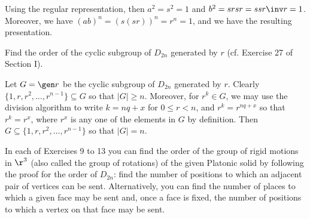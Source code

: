 \begin{problems}
\begin{sol}
        Using the regular representation, then $a^2 = s^2 = 1$ and $b^2 = srsr = ssr\inv r = 1$. Moreover, we have $(ab)^n = (s(sr))^n = r^n = 1$, and we have the resulting presentation.
    \end{sol}
    \item Find the order of the cyclic subgroup of $D_{2n}$ generated by $r$ (cf. Exercise 27 of Section I).
    \begin{sol}
        Let $G = \gen r$ be the cyclic subgroup of $D_{2n}$ generated by $r$. Clearly $\{1, r, r^2, \ldots, r^{n - 1}\} \subseteq G$ so that $|G| \geq n$. Moreover, for $r^k \in G$, we may use the division algorithm to write $k = nq + x$ for $0 \leq r < n$, and $r^k = r^{nq + x}$ so that $r^k = r^x$, where $r^x$ is any one of the elements in $G$ by definition. Then $G \subseteq \{1, r, r^2, \ldots, r^{n - 1}\}$ so that $|G| = n$.
    \end{sol}
\end{problems}
In each of Exercises 9 to 13 you can find the order of the group of rigid motions in $\r^3$ (also called the group of rotations) of the given Platonic solid by following the proof for the order of $D_{2n}$: find the number of positions to which an adjacent pair of vertices can be sent. Alternatively, you can find the number of places to which a given face may be sent and, once a face is fixed, the number of positions to which a vertex on that face may be sent. 
